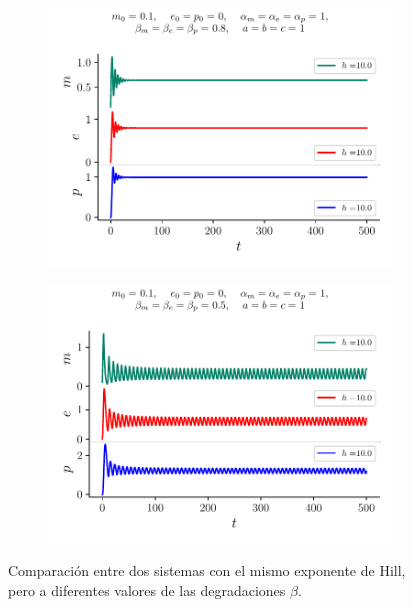 \documentclass[twocolumn,aps,prl]{revtex4-1}
\begin{document}
\begin{figure}[ht!]
  \centering
  \begin{subfigure}[b]{0.49\linewidth}
      \centering
      \includegraphics[width = 0.999\textwidth]{figuras/ex01-concentracion-h-osc-kill.pdf}
      \label{fig:figuras/ex01-concentracion-h-osc-kill}
  \end{subfigure}
  \begin{subfigure}[b]{0.49\linewidth}
      \centering
      \includegraphics[width = 0.999\textwidth]{figuras/ex01-concentracion-h-osc.pdf}
      \label{fig:figuras/ex01-concentracion-h-osc}
  \end{subfigure}\quad
  \caption{Comparación entre dos sistemas con el mismo exponente de Hill, pero a diferentes valores de las degradaciones $\beta$.}
  \label{fig:figuras/ex01-concentracion-osc}
\end{figure}
\end{document}

